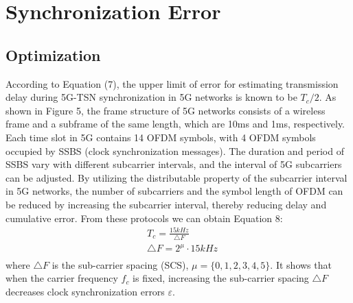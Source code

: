 \documentclass[english]{cccconf}
\begin{document}
\section{Synchronization Error}

\subsection{Optimization}
According to Equation (7), the upper limit of error for estimating transmission delay during 5G-TSN synchronization in 5G networks is known to be $T_c/2$. As shown in Figure 5, the frame structure of 5G networks consists of a wireless frame and a subframe of the same length, which are 10ms and 1ms, respectively. Each time slot in 5G contains 14 OFDM symbols, with 4 OFDM symbols occupied by SSBS (clock synchronization messages). The duration and period of SSBS vary with different subcarrier intervals, and the interval of 5G subcarriers can be adjusted. By utilizing the distributable property of the subcarrier interval in 5G networks, the number of subcarriers and the symbol length of OFDM can be reduced by increasing the subcarrier interval, thereby reducing delay and cumulative error. From these protocols we can obtain Equation 8:
\begin{equation}
	\begin{split}
		&T_{c}=\frac{15kHz}{\triangle F}\\
		&\triangle F=2^\mu\cdot15kHz \\
	\end{split}	
\end{equation}
where $\triangle F$ is the sub-carrier spacing (SCS), $\mu=\{0,1,2,3,4,5\}$. It shows that when the carrier frequency $f_c$ is fixed, increasing the sub-carrier spacing $\triangle F$ decreases clock synchronization errors $\varepsilon$.
\end{document}
